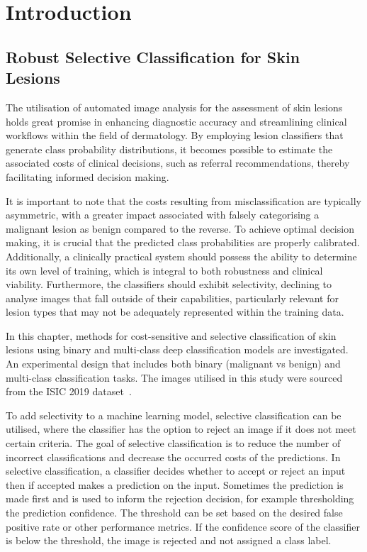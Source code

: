 \section{Introduction}
\label{sec:selective_introduction}
\subsection{Robust Selective Classification for Skin\\Lesions}
\label{subsec:robust and selective}
The utilisation of automated image analysis for the assessment of skin lesions holds great promise in enhancing diagnostic accuracy and streamlining clinical workflows within the field of dermatology. By employing lesion classifiers that generate class probability distributions, it becomes possible to estimate the associated costs of clinical decisions, such as referral recommendations, thereby facilitating informed decision making.

It is important to note that the costs resulting from misclassification are typically asymmetric, with a greater impact associated with falsely categorising a malignant lesion as benign compared to the reverse. To achieve optimal decision making, it is crucial that the predicted class probabilities are properly calibrated. Additionally, a clinically practical system should possess the ability to determine its own level of training, which is integral to both robustness and clinical viability. Furthermore, the classifiers should exhibit selectivity, declining to analyse images that fall outside of their capabilities, particularly relevant for lesion types that may not be adequately represented within the training data.

In this chapter, methods for cost-sensitive and selective classification of skin lesions using binary and multi-class deep classification models are investigated. An experimental design that includes both binary (malignant vs benign) and multi-class classification tasks. The images utilised in this study were sourced from the ISIC 2019 dataset~\citep{codella2018skin,combalia2019bcn20000,tschandl2018ham10000}.

To add selectivity to a machine learning model, selective classification can be utilised, where the classifier has the option to reject an image if it does not meet certain criteria. The goal of selective classification is to reduce the number of incorrect classifications and decrease the occurred costs of the predictions. In selective classification, a classifier decides whether to accept or reject an input then if accepted makes a prediction on the input. Sometimes the prediction is made first and is used to inform the rejection decision, for example thresholding the prediction confidence. The threshold can be set based on the desired false positive rate or other performance metrics. If the confidence score of the classifier is below the threshold, the image is rejected and not assigned a class label.

